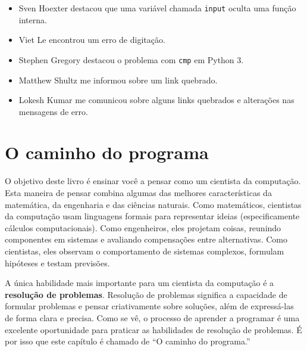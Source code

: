 \documentclass[10pt]{book}
\begin{document}
\begin {itemize}
\item Sven Hoexter destacou que uma variável chamada {\tt input}
oculta uma função interna.

\item Viet Le encontrou um erro de digitação.

\item Stephen Gregory destacou o problema com {\tt cmp}
em Python 3.

\item Matthew Shultz me informou sobre um link quebrado.

\item Lokesh Kumar me comunicou sobre alguns links quebrados e
alterações nas mensagens de erro.


\end{itemize}

\normalsize
\clearemptydoublepage

\begin{latexonly}

\tableofcontents

\clearemptydoublepage

\end{latexonly}

\mainmatter

\chapter{O caminho do programa}

O objetivo deste livro é ensinar você a pensar como um
cientista da computação. Esta maneira de pensar combina algumas das melhores características
da matemática, da engenharia e das ciências naturais. Como matemáticos,
cientistas da computação usam linguagens formais para representar ideias (especificamente
cálculos computacionais). Como engenheiros, eles projetam coisas, reunindo componentes
em sistemas e avaliando compensações entre alternativas. Como cientistas,
eles observam o comportamento de sistemas complexos, formulam hipóteses e testam
previsões.

A única habilidade mais importante para um cientista da computação é a {\bf
resolução de problemas}. Resolução de problemas significa a capacidade de formular
problemas e pensar criativamente sobre soluções, além de expressá-las de forma clara
e precisa. Como se vê, o processo de aprender a programar é uma
excelente oportunidade para praticar as habilidades de resolução de problemas. É por isso que
este capítulo é chamado de ``O caminho do programa.''
\end{document}
